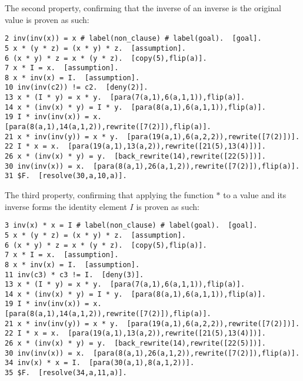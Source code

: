 The second property, confirming that the inverse of an inverse is the original value is proven as such:\\
\begin{verbatim}
2 inv(inv(x)) = x # label(non_clause) # label(goal).  [goal].
5 x * (y * z) = (x * y) * z.  [assumption].
6 (x * y) * z = x * (y * z).  [copy(5),flip(a)].
7 x * I = x.  [assumption].
8 x * inv(x) = I.  [assumption].
10 inv(inv(c2)) != c2.  [deny(2)].
13 x * (I * y) = x * y.  [para(7(a,1),6(a,1,1)),flip(a)].
14 x * (inv(x) * y) = I * y.  [para(8(a,1),6(a,1,1)),flip(a)].
19 I * inv(inv(x)) = x.  [para(8(a,1),14(a,1,2)),rewrite([7(2)]),flip(a)].
21 x * inv(inv(y)) = x * y.  [para(19(a,1),6(a,2,2)),rewrite([7(2)])].
22 I * x = x.  [para(19(a,1),13(a,2)),rewrite([21(5),13(4)])].
26 x * (inv(x) * y) = y.  [back_rewrite(14),rewrite([22(5)])].
30 inv(inv(x)) = x.  [para(8(a,1),26(a,1,2)),rewrite([7(2)]),flip(a)].
31 $F.  [resolve(30,a,10,a)].
\end{verbatim}
The third property, confirming that applying the function $*$ to a value and its inverse forms the identity element $I$ is proven as such:\\
\begin{verbatim}
3 inv(x) * x = I # label(non_clause) # label(goal).  [goal].
5 x * (y * z) = (x * y) * z.  [assumption].
6 (x * y) * z = x * (y * z).  [copy(5),flip(a)].
7 x * I = x.  [assumption].
8 x * inv(x) = I.  [assumption].
11 inv(c3) * c3 != I.  [deny(3)].
13 x * (I * y) = x * y.  [para(7(a,1),6(a,1,1)),flip(a)].
14 x * (inv(x) * y) = I * y.  [para(8(a,1),6(a,1,1)),flip(a)].
19 I * inv(inv(x)) = x.  [para(8(a,1),14(a,1,2)),rewrite([7(2)]),flip(a)].
21 x * inv(inv(y)) = x * y.  [para(19(a,1),6(a,2,2)),rewrite([7(2)])].
22 I * x = x.  [para(19(a,1),13(a,2)),rewrite([21(5),13(4)])].
26 x * (inv(x) * y) = y.  [back_rewrite(14),rewrite([22(5)])].
30 inv(inv(x)) = x.  [para(8(a,1),26(a,1,2)),rewrite([7(2)]),flip(a)].
34 inv(x) * x = I.  [para(30(a,1),8(a,1,2))].
35 $F.  [resolve(34,a,11,a)].
\end{verbatim}

